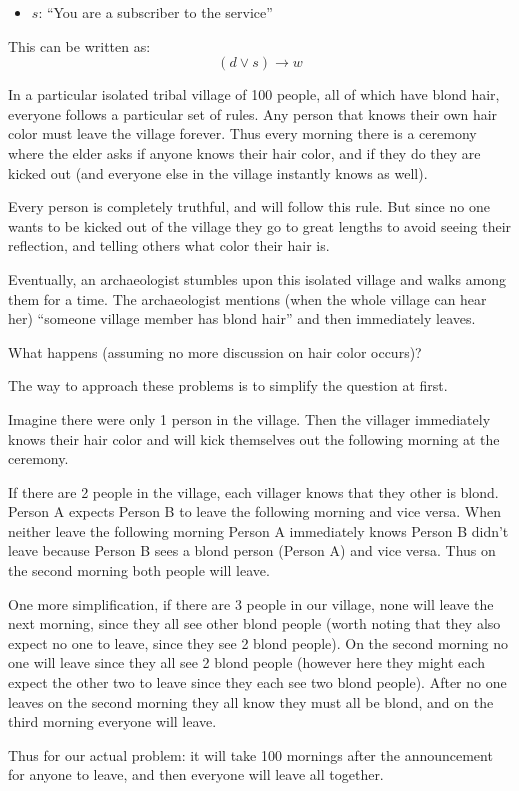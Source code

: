 \documentclass[addpoints, answers]{exam}
\begin{document}
\begin{questions}
\begin{itemize}
    \item $s$: ``You are a subscriber to the service''
  \end{itemize}

  \begin{solution}
    This can be written as:
    \[
      (d\vee s)\rightarrow w
    \]
  \end{solution}

  \question[9] In a particular isolated tribal village of 100 people, all
  of which have blond hair, everyone follows a particular set of rules. Any
  person that knows their own hair color must leave the village forever. Thus
  every morning there is a ceremony where the elder asks if anyone knows their
  hair color, and if they do they are kicked out (and everyone else in the
  village instantly knows as well). 

  Every person is completely truthful, and will follow this rule. But since no
  one wants to be kicked out of the village they go to great lengths to avoid
  seeing their reflection, and telling others what color their hair is.

  Eventually, an archaeologist stumbles upon this isolated village and walks
  among them for a time. The archaeologist mentions (when the whole village can
  hear her) ``someone village member has blond hair'' and then immediately
  leaves.

  What happens (assuming no more discussion on hair color occurs)?

  \begin{solution}
    The way to approach these problems is to simplify the question at first.

    Imagine there were only 1 person in the village. Then the villager
    immediately knows their hair color and will kick themselves out the
    following morning at the ceremony.

    If there are 2 people in the village, each villager knows that they other is
    blond. Person A expects Person B to leave the following morning and vice
    versa. When neither leave the following morning Person A immediately knows
    Person B didn't leave because Person B sees a blond person (Person A) and
    vice versa. Thus on the second morning both people will leave.

    One more simplification, if there are 3 people in our village, none will
    leave the next morning, since they all see other blond people (worth noting
    that they also expect no one to leave, since they see 2 blond people). On
    the second morning no one will leave since they all see 2 blond people 
    (however here they might each expect the other two to leave since they each
    see two blond people). After no one leaves on the second morning they all
    know they must all be blond, and on the third morning everyone will leave.

    Thus for our actual problem: it will take 100 mornings after the
    announcement for anyone to leave, and then everyone will leave all together.
  \end{solution}
\end{questions}
\end{document}
